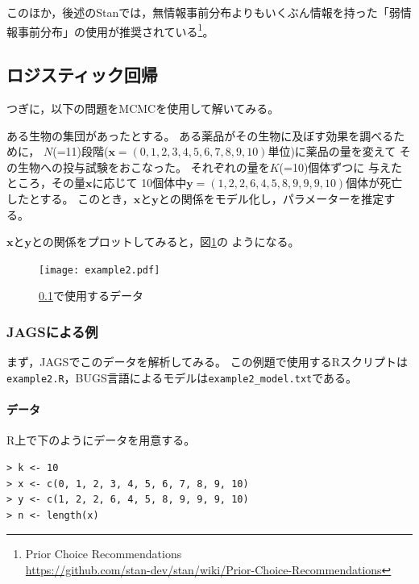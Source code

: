 \documentclass[11pt,uplatex]{jsarticle}
\begin{document}
このほか，後述の\textsf{Stan}では，無情報事前分布よりもいくぶん情報を持った「弱情報事前分布」の使用が推奨されている\footnote{Prior Choice Recommendations\\ \url{https://github.com/stan-dev/stan/wiki/Prior-Choice-Recommendations}}。



\subsection{ロジスティック回帰}
\label{logistic}


つぎに，以下の問題をMCMCを使用して解いてみる。
\vspace{1zw}

\hspace{18mm}
\begin{minipage}{100mm}
\begin{breakbox}
\noindent
ある生物の集団があったとする。
ある薬品がその生物に及ぼす効果を調べるために，
$N$(=11)段階($\bm{x} = (0, 1, 2, 3, 4, 5, 6, 7, 8, 9, 10)$単位)に薬品の量を変えて
その生物への投与試験をおこなった。
それぞれの量を$K$(=10)個体ずつに
与えたところ，その量$\bm{x}$に応じて
10個体中$\bm{y} = (1, 2, 2, 6, 4, 5, 8, 9, 9, 9, 10)$個体が死亡したとする。
このとき，$\bm{x}$と$\bm{y}$との関係をモデル化し，パラメーターを推定する。
\end{breakbox}
\end{minipage}
\vspace{1zw}

$\bm{x}$と$\bm{y}$との関係をプロットしてみると，図\ref{example2_plot}の
ようになる。

\begin{figure}[htbp]
  \begin{center}
    \texttt{[image: example2.pdf]}
  \end{center}
  \caption{\ref{logistic}で使用するデータ}
  \label{example2_plot}
\end{figure}

\subsubsection{JAGSによる例}

まず，\textsf{JAGS}でこのデータを解析してみる。
この例題で使用する\textsf{R}スクリプトは\texttt{example2.R}，\textsf{BUGS}言語によるモデルは\texttt{example2\_model.txt}である。

\paragraph{データ}
\textsf{R}上で下のようにデータを用意する。
\begin{lstlisting}
> k <- 10
> x <- c(0, 1, 2, 3, 4, 5, 6, 7, 8, 9, 10)
> y <- c(1, 2, 2, 6, 4, 5, 8, 9, 9, 9, 10)
> n <- length(x)
\end{lstlisting}
\end{document}

